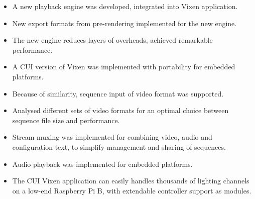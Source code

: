 

\begin{itemize}[noitemsep]
  \item A new playback engine was developed, integrated into Vixen application.
  \item New export formats from pre-rendering implemented for the new engine.
  \item The new engine reduces layers of overheads, achieved remarkable performance.
  \item A CUI version of Vixen was implemented with portability for embedded platforms.
  \item Because of similarity, sequence input of video format was supported.
  \item Analysed different sets of video formats for an optimal choice between sequence file size and performance.
  \item Stream muxing was implemented for combining video, audio and configuration text, to simplify management and sharing of sequences.
  \item Audio playback was implemented for embedded platforms.
  \item The CUI Vixen application can easily handles thousands of lighting channels on a low-end Raspberry Pi B, with extendable controller support as modules.
\end{itemize}
